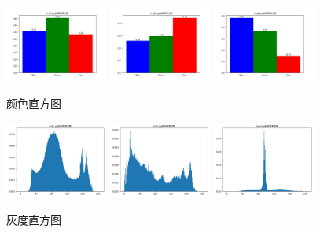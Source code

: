 \documentclass{article}
\begin{document}
\begin{figure}[h]
    \centering
    \includegraphics[width=0.3\textwidth]{./colormap/img1}
    \includegraphics[width=0.3\textwidth]{./colormap/img2}
    \includegraphics[width=0.3\textwidth]{./colormap/img3}
    \caption{颜色直方图}
\end{figure}

\begin{figure}[h]
    \centering
    \includegraphics[width=0.3\textwidth]{./greymap/img1}
    \includegraphics[width=0.3\textwidth]{./greymap/img2}
    \includegraphics[width=0.3\textwidth]{./greymap/img3}
    \caption{灰度直方图}
\end{figure}
\end{document}
